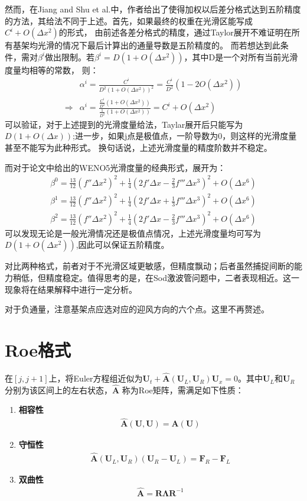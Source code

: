 \documentclass[12pt, a4paper]{article}
\begin{document}
然而，在Jiang and Shu et al.中，作者给出了使得加权以后差分格式达到五阶精度的方法，其给法不同于上述。首先，如果最终的权重在光滑区能写成$C^i+O(\Delta x^2)$的形式，
由前述各差分格式的精度，通过Taylor展开不难证明在所有基架均光滑的情况下最后计算出的通量导数是五阶精度的。
而若想达到此条件，需对$\beta^i$做出限制。若$\beta^i=D(1+O(\Delta x^2))$，其中D是一个对所有当前光滑度量均相等的常数，
则：
\begin{align}
    &\alpha^i = \frac{C^i}{D^2(1+O(\Delta x^2))^2}=\frac{C^i}{D^2}(1-2O(\Delta x^2)) \\
    \Rightarrow &\alpha^i = \frac{\frac{C^i}{D^2}(1+O(\Delta x^2))}{\frac{1}{D^2}(1+O(\Delta x^2))} = C^i + O(\Delta x^2)
\end{align}
可以验证，对于上述提到的光滑度量给法，Taylar展开后只能写为$D(1+O(\Delta x))$;进一步，如果j点是极值点，一阶导数为0，则这样的光滑度量甚至不能写为此种形式。
换句话说，上述光滑度量的精度阶数并不稳定。

而对于论文中给出的WENO5光滑度量的经典形式，展开为：
\begin{align}
    \beta^0 = \frac{13}{12}(f''\Delta x^2)^2+\frac{1}{4}(2f'\Delta x-\frac{2}{3}f'''\Delta x^3)^2 + O(\Delta x^6)\\
    \beta^1 = \frac{13}{12}(f''\Delta x^2)^2+\frac{1}{4}(2f'\Delta x+\frac{1}{3}f'''\Delta x^3)^2 + O(\Delta x^6)\\
    \beta^2 = \frac{13}{12}(f''\Delta x^2)^2+\frac{1}{4}(2f'\Delta x-\frac{2}{3}f'''\Delta x^3)^2 + O(\Delta x^6)
\end{align}
可以发现无论是一般光滑情况还是极值点情况，上述光滑度量均可写为$D(1+O(\Delta x^2))$,因此可以保证五阶精度。

对比两种格式，前者对于不光滑区域更敏感，但精度飘动；后者虽然捕捉间断的能力稍低，但精度稳定。值得思考的是，在Sod激波管问题中，二者表现相近。这一现象将在结果解释中进行一定分析。

对于负通量，注意基架点应选对应的迎风方向的六个点。这里不再赘述。

\section{Roe格式}
在$[j, j+1]$上，将Euler方程组近似为$\mathbf{U}_t+\widehat{\mathbf{A}}(\mathbf{U}_L, \mathbf{U}_R)\mathbf{U}_x=0$。其中$\mathbf{U}_L$和$\mathbf{U}_R$分别为该区间上的左右状态，$\widehat{\mathbf{A}}$
称为Roe矩阵，需满足如下性质：
\begin{enumerate}
    \item \textbf{相容性}
    \begin{align}
        \widehat{\mathbf{A}}(\mathbf{U}, \mathbf{U}) = \mathbf{A}(\mathbf{U})
    \end{align}
    \item \textbf{守恒性}
    \begin{align}
        \widehat{\mathbf{A}}(\mathbf{U}_L, \mathbf{U}_R)(\mathbf{U}_R - \mathbf{U}_L)=\mathbf{F}_R-\mathbf{F}_L
    \end{align}
    \item \textbf{双曲性}
    \begin{align}
        \widehat{\mathbf{A}} = \mathbf{R}\bm{\Lambda}\mathbf{R}^{-1}
    \end{align}
\end{enumerate}
\end{document}
